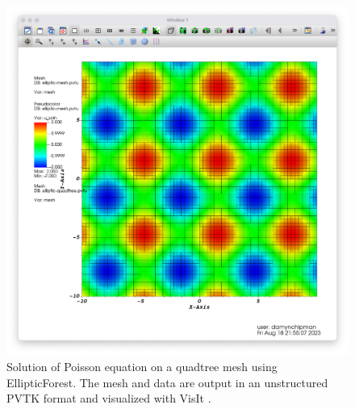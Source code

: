 \begin{figure}
    \centering
    \includegraphics[width=\textwidth, clip=true, trim={0 0 0 0}]{figures/sine_cosine_output.png}
    \caption{Solution of Poisson equation on a quadtree mesh using EllipticForest. The mesh and data are output in an unstructured PVTK format and visualized with VisIt \citep{HPV:VisIt}.}
    \label{fig:poisson_solution}
\end{figure}

